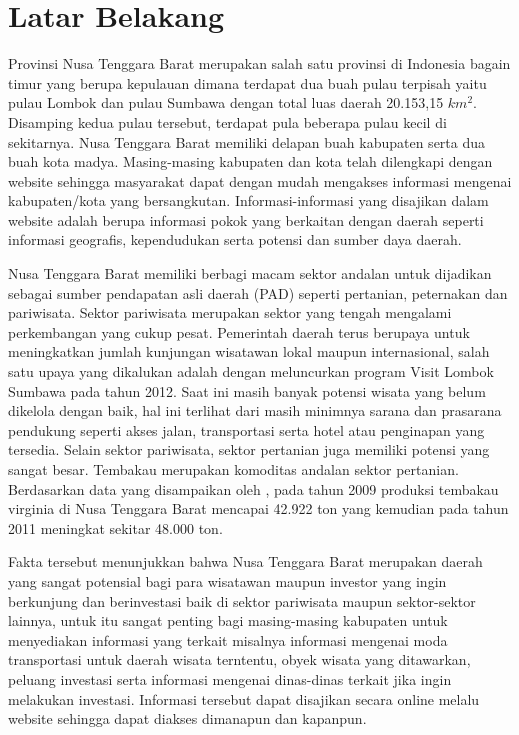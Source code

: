 \section{Latar Belakang}
Provinsi Nusa Tenggara Barat merupakan salah satu provinsi di Indonesia bagain timur yang berupa kepulauan dimana terdapat dua buah pulau terpisah yaitu pulau Lombok dan pulau Sumbawa dengan total luas daerah 20.153,15 $km^{2}$. Disamping kedua pulau tersebut, terdapat pula beberapa pulau kecil di sekitarnya. Nusa Tenggara Barat memiliki delapan buah kabupaten serta dua buah kota madya. Masing-masing kabupaten dan kota telah dilengkapi dengan website sehingga masyarakat dapat dengan mudah mengakses informasi mengenai kabupaten/kota yang bersangkutan. Informasi-informasi yang disajikan dalam website adalah berupa informasi pokok yang berkaitan dengan daerah seperti informasi geografis, kependudukan serta potensi dan sumber daya daerah.

Nusa Tenggara Barat memiliki berbagi macam sektor andalan untuk dijadikan sebagai sumber pendapatan asli daerah (PAD) seperti pertanian, peternakan dan pariwisata. Sektor pariwisata merupakan sektor yang tengah mengalami perkembangan yang cukup pesat. Pemerintah daerah terus berupaya untuk meningkatkan jumlah kunjungan wisatawan lokal maupun internasional, salah satu upaya yang dikalukan adalah dengan meluncurkan program Visit Lombok Sumbawa pada tahun 2012. Saat ini masih banyak potensi wisata yang belum dikelola dengan baik, hal ini terlihat dari masih minimnya sarana dan prasarana pendukung seperti akses jalan, transportasi serta hotel atau penginapan yang tersedia. Selain sektor pariwisata, sektor pertanian juga memiliki potensi yang sangat besar. Tembakau merupakan komoditas andalan sektor pertanian. Berdasarkan data yang disampaikan oleh \citep*{nur_apriana}, pada tahun 2009 produksi tembakau virginia di Nusa Tenggara Barat mencapai 42.922 ton yang kemudian pada tahun 2011 meningkat sekitar 48.000 ton.

Fakta tersebut menunjukkan bahwa Nusa Tenggara Barat merupakan daerah yang sangat potensial bagi para wisatawan maupun investor yang ingin berkunjung dan berinvestasi baik di sektor pariwisata maupun sektor-sektor lainnya, untuk itu sangat penting bagi masing-masing kabupaten untuk menyediakan informasi yang terkait misalnya informasi mengenai moda transportasi untuk daerah wisata terntentu, obyek wisata yang ditawarkan, peluang investasi serta informasi mengenai dinas-dinas terkait jika ingin melakukan investasi. Informasi tersebut dapat disajikan secara online melalu website sehingga dapat diakses dimanapun dan kapanpun.

